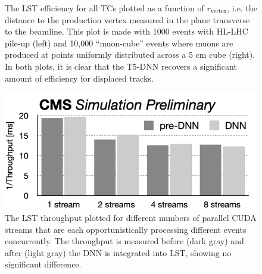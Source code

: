 \begin{figure}[!htb]
    \centering
    \qquad
    \caption[LST efficiency for all TCs plotted as a function of $r_\text{vertex}$.]{
        The LST efficiency for all TCs plotted as a function of $r_\text{vertex}$, i.e. the distance to the production vertex measured in the plane transverse to the beamline.
        This plot is made with 1000 \ttbar events with HL-LHC pile-up (left) and 10,000 ``muon-cube'' events where muons are produced at points uniformly distributed across a 5 cm cube (right).
        In both plots, it is clear that the T5-DNN recovers a significant amount of efficiency for displaced tracks.
    }
    \label{fig:t5dnn_dis}
\end{figure}

\begin{figure}[!htb]
    \centering
    \includegraphics[width=0.75\linewidth]{fig/lst/throughput_vs_streams.pdf}
    \caption[LST throughput plotted for different numbers of parallel CUDA streams.]{
        The LST throughput plotted for different numbers of parallel CUDA streams that are each opportunistically processing different events concurrently. 
        The throughput is measured before (dark gray) and after (light gray) the DNN is integrated into LST, showing no significant difference.
    }
    \label{fig:streams-vs-throughput}
\end{figure}


